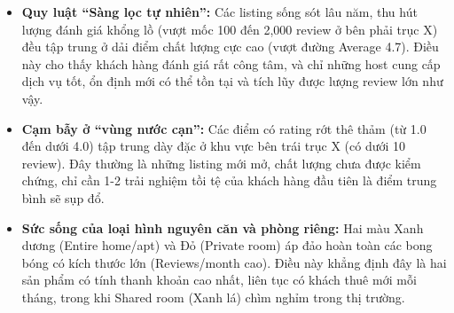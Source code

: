 \begin{itemize}
    \item \textbf{Quy luật ``Sàng lọc tự nhiên'':} Các listing sống sót lâu năm, thu hút lượng đánh giá khổng lồ (vượt mốc 100 đến 2,000 review ở bên phải trục X) đều tập trung ở dải điểm chất lượng cực cao (vượt đường Average 4.7). Điều này cho thấy khách hàng đánh giá rất công tâm, và chỉ những host cung cấp dịch vụ tốt, ổn định mới có thể tồn tại và tích lũy được lượng review lớn như vậy.
    \item \textbf{Cạm bẫy ở ``vùng nước cạn'':} Các điểm có rating rớt thê thảm (từ 1.0 đến dưới 4.0) tập trung dày đặc ở khu vực bên trái trục X (có dưới 10 review). Đây thường là những listing mới mở, chất lượng chưa được kiểm chứng, chỉ cần 1-2 trải nghiệm tồi tệ của khách hàng đầu tiên là điểm trung bình sẽ sụp đổ.
    \item \textbf{Sức sống của loại hình nguyên căn và phòng riêng:} Hai màu Xanh dương (Entire home/apt) và Đỏ (Private room) áp đảo hoàn toàn các bong bóng có kích thước lớn (Reviews/month cao). Điều này khẳng định đây là hai sản phẩm có tính thanh khoản cao nhất, liên tục có khách thuê mới mỗi tháng, trong khi Shared room (Xanh lá) chìm nghỉm trong thị trường.
\end{itemize}
